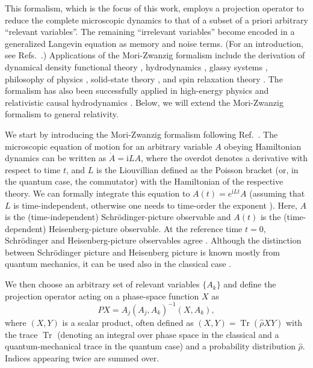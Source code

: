 \documentclass[aps,prl,11pt,nofootinbib]{revtex4-1}
\newcommand{\ii}{\mathrm{i}}%
\newcommand{\Tr}{\operatorname{Tr}}%
\newcommand{\ZT}[1]{\textquotedblleft#1\textquotedblright}%
\begin{document}
This formalism, which is the focus of this work, employs a projection operator to reduce the complete microscopic dynamics to that of a subset of a priori arbitrary  \ZT{relevant variables}. The remaining \ZT{irrelevant variables} become encoded in a generalized Langevin equation as memory and noise terms. (For an introduction, see Refs.\ \cite{Grabert1982,teVrugtW2019d,KlipensteinTJSvdV2021,RauM1996,Schilling2021}.) Applications of the Mori-Zwanzig formalism include the derivation of dynamical density functional theory \cite{teVrugtLW2020,Yoshimori2005,EspanolL2009,WittkowskiLB2012,WittkowskiLB2013,WittkowskitVJLB2021}, hydrodynamics \cite{WittkowskitVJLB2021,CamargodlTDZEDBC2018}, glassy systems \cite{Das2004}, philosophy of physics \cite{teVrugt2020,Robertson2018,Wallace2015}, solid-state theory \cite{Fulde1995,KakehashiF2004}, and spin relaxation theory \cite{teVrugtW2019,KivelsonO1974,Bouchard2007}. The formalism has also been successfully applied in high-energy physics and relativistic causal hydrodynamics \cite{HuangKKR2011,KoideK2008,KoideNK2009,Koide2007,KoideM2000,KoideMT1999}. Below, we will extend the Mori-Zwanzig formalism to general relativity. 
 
We start by introducing the Mori-Zwanzig formalism following Ref.\ \cite{teVrugtW2019d}. The microscopic equation of motion for an arbitrary variable $A$ obeying Hamiltonian dynamics can be written as $\dot{A} = \ii L A$, where the overdot denotes a derivative with respect to time $t$, and $L$ is the Liouvillian defined as the Poisson bracket (or, in the quantum case, the commutator) with the Hamiltonian of the respective theory. We can  formally integrate this equation to $A(t) = e^{\ii L t} A$ (assuming that $L$ is time-independent, otherwise one needs to time-order the exponent \cite{teVrugtW2019}). Here, $A$ is the (time-independent) Schr\"odinger-picture observable and $A(t)$ is the (time-dependent) Heisenberg-picture observable. At the reference time $t=0$, Schr\"odinger and Heisenberg-picture observables agree \cite{teVrugtW2019d,BalianV1985}. Although the distinction between Schr\"odinger picture and Heisenberg picture is known mostly from quantum mechanics, it can be used also in the classical case \cite{HolianE1985}.

We then choose an arbitrary set of relevant variables $\{A_k\}$ and define the projection operator acting on a phase-space function $X$ as
\begin{equation}
PX = A_j(A_j,A_k)^{-1}(X,A_k),  
\end{equation}
where $(X,Y)$ is a scalar product, often defined as $(X,Y) = \Tr(\hat{\rho}XY)$ with the trace $\Tr$ (denoting an integral over phase space in the classical and a quantum-mechanical trace in the quantum case) and a probability distribution $\hat{\rho}$. Indices appearing twice are summed over. 
\end{document}
